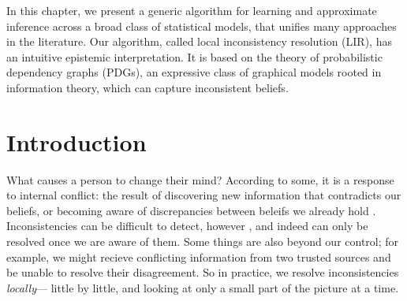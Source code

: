     \label{chap:LIR}

In this chapter, 
we present a generic algorithm
    for learning and
    approximate inference
    across a broad class of statistical models,
    that unifies many approaches in the literature.
Our algorithm,
    called local inconsistency resolution (LIR),
    has an intuitive epistemic interpretation.
It is based on the theory of
    probabilistic dependency graphs (PDGs),
    an expressive class of graphical models
        rooted in information theory,
        which can capture inconsistent beliefs.

\section{Introduction}
What causes a person to change their mind?
According to some,
    it is a response to internal conflict:
    the result of
    discovering new information that contradicts our beliefs, or
    becoming aware of discrepancies between beleifs we already hold
    \cite{festinger1962cognitive}.
Inconsistencies
    can be difficult to detect, however
    \cite{selman1996generating}, and indeed can only
    be resolved once we are aware of them.
Some things are also
 beyond our control;
    for example, we might recieve conflicting information
        from two trusted sources and be unable to resolve
        their disagreement.
So in practice, we resolve inconsistencies \emph{locally}---%
    little by little, and looking at
        only a small part of the picture at a time.

